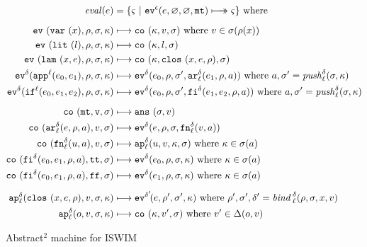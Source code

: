 \documentclass[preprint,onecolumn,9pt]{sigplanconf} %
\begin{document}
\begin{figure}
\begin{align*}
\mathit{eval}(\mexp) &= \{ \mstate\ |\ \ev[^{\mtcntr}]{\mexp,\varnothing,\varnothing,\kmt} \multimachstep \mstate \} \text{ where }
\\[2mm]
\ev{\svar\mvar,\menv,\msto,\mkont} &\machstep
\co{\mkont,\mval,\msto}
\text{ where }\mval \in \msto(\menv(\mvar))
\\
\ev{\slit\mlit,\menv,\msto,\mkont} &\machstep
\co{\mkont,\mlit,\msto}
\\
\ev{\slam\mvar\mexp,\menv,\msto,\mkont} &\machstep
\co{\mkont,\clos{\mvar,\mexp,\menv},\msto}
\\
\ev[^\mcntr]{\sapp[^\mlab]{\mexpi0}{\mexpi1},\menv,\msto,\mkont} &\machstep
\ev[^\mcntr]{\mexpi{0},\menv,\msto',\kar[_\mlab^\mcntr]{\mexpi{1},\menv,\maddr}}
\text{ where }\maddr,\msto' = \mathit{push}^\mcntr_\mlab(\msto,\mkont)
\\
\ev[^\mcntr]{\sif[^\mlab]{\mexpi0}{\mexpi1}{\mexpi2},\menv,\msto,\mkont} &\machstep
\ev[^\mcntr]{\mexpi0,\menv,\msto',\kif[^\mcntr]{\mexpi1,\mexpi2,\menv,\maddr}}
\text{ where }\maddr,\msto' = \mathit{push}_\mlab^\mcntr(\msto,\mkont)
\\[2mm]
\co{\kmt,\mval,\msto} &\machstep
\ans{\msto,\mval}
\\
\co{\kar[^\mcntr_\mlab]{\mexp,\menv,\maddr},\mval,\msto} & \machstep
\ev[^\mcntr]{\mexp,\menv,\msto,\kfn[^\mcntr_\mlab]{\mval,\maddr}}
\\
\co{\kfn[^\mcntr_\mlab]{{\mvalx{u}},\maddr},\mval,\msto} & \machstep
\ap[^\mcntr_\mlab]{\mvalx{u},\mval,\mkont,\msto}
\text{ where }\mkont \in \msto(\maddr)
\\
\co{\kif[^\mcntr]{\mexpi0,\mexpi1,\menv,\maddr},\strue,\msto} & \machstep
\ev[^\mcntr]{\mexpi0,\menv,\msto,\mkont}
\text{ where }\mkont\in\msto(\maddr)
\\
\co{\kif[^\mcntr]{\mexpi0,\mexpi1,\menv,\maddr},\sfalse,\msto} & \machstep
\ev[^\mcntr]{\mexpi1,\menv,\msto,\mkont}
\text{ where }\mkont\in\msto(\maddr)
\\[2mm]
\ap[^\mcntr_\mlab]{\clos{\mvar,\mexp,\menv},\mval,\msto,\mkont} & \machstep
\ev[^{\mcntr'}\!]{\mexp,\menv',\msto',\mkont}
\text{ where }\menv',\msto',\mcntr' = \mathit{bind\,}^{ \mcntr}_\mlab(\menv,\msto,\mvar,\mval)
\\
\ap[^\mcntr_\mlab]{\mop,\mval,\msto,\mkont} & \machstep
\co{\mkont,\mval',\msto}
\text{ where } \mval'\in\interpdelta(\mop,\mval)
\end{align*}
\caption{Abstract$^2$ machine for ISWIM}
\label{fig:aam}
\end{figure}
\end{document}
